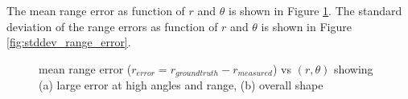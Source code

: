 		The mean range error as function of $r$ and $\theta$ is shown in Figure \ref{fig:mean_range_error}. The standard deviation of the range errors as function of $r$ and $\theta$ is shown in Figure \ref{fig:stddev_range_error}.
		\begin{figure}
	  		\centering
	  		\caption{mean range error ($r_{error} = r_{ground truth} - r_{measured}$) vs $(r,\theta)$ showing (a) large error at high angles and range, (b) overall shape}
	  		\label{fig:mean_range_error}
		\end{figure}
		
